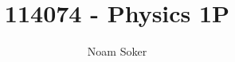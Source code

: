 \documentclass[]{article}
\title{114074 - Physics 1P}
\author{Noam Soker}
\begin{document}
\maketitle

\begin{abstract}

\end{abstract}


























\end{document}

